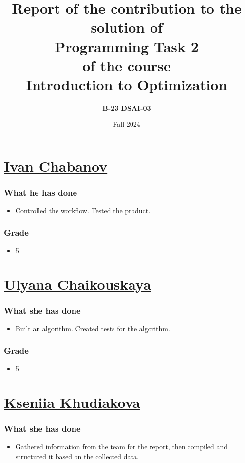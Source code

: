 \documentclass{article}
\title{Report of the \textbf{contribution} to the solution of \\ \textbf{Programming Task 2} \\ of the course \\ \textbf{Introduction to Optimization}}
\author{\textbf{B-23 DSAI-03}}
\date{Fall 2024}
\begin{document}
\maketitle

\section{\href{mailto:i.chabanov@innopolis.university}{Ivan Chabanov}}
\subsubsection*{What he has done}
\begin{itemize}
    \item Controlled the workflow. Tested the product.
\end{itemize}
\subsubsection*{Grade}
\begin{itemize}
    \item 5
\end{itemize}

\section{\href{mailto:u.chaikouskaya@innopolis.university}{Ulyana Chaikouskaya}}
\subsubsection*{What she has done}
\begin{itemize}
    \item Built an algorithm. Created tests for the algorithm.
\end{itemize}
\subsubsection*{Grade}
\begin{itemize}
    \item 5
\end{itemize}

\section{\href{mailto:k.khudiakova@innopolis.university}{Kseniia Khudiakova}}
\subsubsection*{What she has done}
\begin{itemize}
    \item Gathered information from the team for the report, then compiled and structured it based on the collected data.
\end{itemize}
\end{document}
